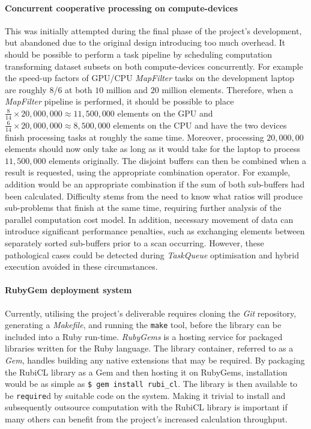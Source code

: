 \paragraph*{Concurrent cooperative processing on compute-devices} This was initially attempted during the final phase of the project's development, but abandoned due to the original design introducing too much overhead. It should be possible to perform a task pipeline by scheduling computation transforming dataset subsets on both compute-devices concurrently. For example the speed-up factors of \ac{GPU}/\ac{CPU} \emph{MapFilter} tasks on the development laptop are roughly $8$/$6$ at both $10$ million and $20$ million elements. Therefore, when a \emph{MapFilter} pipeline is performed, it should be possible to place $\frac{8}{14} \times 20,000,000 \approx 11,500,000$ elements on the \ac{GPU} and $\frac{6}{14} \times 20,000,000 \approx 8,500,000$ elements on the \ac{CPU} and have the two devices finish processing tasks at roughly the same time. Moreover, processing $20,000,00$ elements should now only take as long as it would take for the laptop to process $11,500,000$ elements originally. The disjoint buffers can then be combined when a result is requested, using the appropriate combination operator. For example, addition would be an appropriate combination if the sum of both sub-buffers had been calculated. Difficulty stems from the need to know what ratios will produce sub-problems that finish at the same time, requiring further analysis of the parallel computation cost model. In addition, necessary movement of data can introduce significant performance penalties, such as exchanging elements between separately sorted sub-buffers prior to a scan occurring. However, these pathological cases could be detected during \emph{TaskQueue} optimisation and hybrid execution avoided in these circumstances.

\paragraph*{RubyGem deployment system}
Currently, utilising the project's deliverable requires cloning the \emph{Git} repository, generating a \emph{Makefile}, and running the \verb|make| tool, before the library can be included into a Ruby run-time.
\emph{RubyGems}\cite{rubygems} is a hosting service for packaged libraries written for the Ruby language. The library container, referred to as a \emph{Gem}, handles building any native extensions that may be required.
By packaging the RubiCL library as a Gem and then hosting it on RubyGems, installation would be as simple as \verb|$ gem install rubi_cl|. The library is then available to be \verb|require|d by suitable code on the system. Making it trivial to install and subsequently outsource computation with the RubiCL library is important if many others can benefit from the project's increased calculation throughput.

